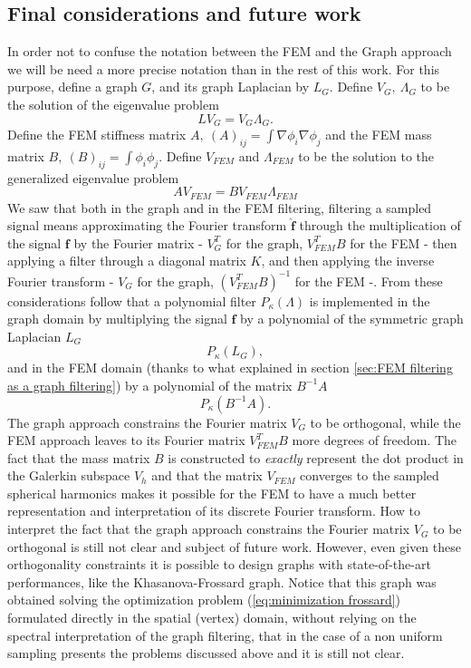 \subsection{Final considerations and future work}
In order not to confuse the notation between the FEM and the Graph approach we will be need a more precise notation than in the rest of this work. For this purpose, define a graph $G$, and its graph Laplacian by $L_G$. Define $V_G,\ \Lambda_G$ to be the solution of the eigenvalue problem
$$
L V_G = V_G \Lambda_G.
$$
Define the FEM stiffness matrix $A,\ (A)_{ij} = \int\nabla\phi_i\nabla\phi_j$ and the FEM mass matrix $B,\ (B)_{ij} = \int\phi_i\phi_j$. Define $V_{FEM}$ and $\Lambda_{FEM}$ to be the solution to the generalized eigenvalue problem 
$$
AV_{FEM} = BV_{FEM}\Lambda_{FEM}
$$
We saw that both in the graph and in the FEM filtering, filtering a sampled signal means approximating the Fourier transform $\hat{\mathbf f}$ through the multiplication of the signal $\mathbf f$ by the Fourier matrix - $V_G^T$ for the graph, $V_{FEM}^TB$ for the FEM - then applying a filter through a diagonal matrix $K$, and then applying the inverse Fourier transform - $V_G$ for the graph, $(V_{FEM}^TB)^{-1}$ for the FEM -. From these considerations follow that a polynomial filter $P_\kappa(\Lambda)$ is implemented in the graph domain by multiplying the signal $\mathbf f$ by a polynomial of the symmetric graph Laplacian $L_G$
$$
P_\kappa(L_G),
$$
and in the FEM domain (thanks to what explained in section \ref{sec:FEM filtering as a graph filtering}) by a polynomial of the matrix $B^{-1}A$
$$P_\kappa(B^{-1}A).
$$
The graph approach constrains the Fourier matrix $V_G$ to be orthogonal, while the FEM approach leaves to its Fourier matrix $V_{FEM}^TB$ more degrees of freedom. The fact that the mass matrix $B$ is constructed to \textit{exactly} represent the dot product in the Galerkin subspace $V_h$ and that the matrix $V_{FEM}$ converges to the sampled spherical harmonics makes it possible for the FEM to have a much better representation and interpretation of its discrete Fourier transform. How to interpret the fact that the graph approach constrains the Fourier matrix $V_G$ to be orthogonal is still not clear and subject of future work. However, even given these orthogonality constraints it is possible to design graphs with state-of-the-art performances, like the Khasanova-Frossard graph. Notice that this graph was obtained solving the optimization problem (\ref{eq:minimization frossard}) formulated directly in the spatial (vertex) domain, without relying on the spectral interpretation of the graph filtering, that in the case of a non uniform sampling presents the problems discussed above and it is still not clear.

